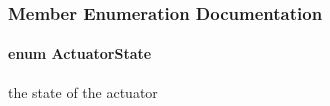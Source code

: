 \subsubsection{Member Enumeration Documentation}
\hypertarget{classOpenRAVE_1_1SensorBase_1_1ActuatorSensorData_aff7db6eb3c126e9c2c2c116ed181fa3c}{
\paragraph[{ActuatorState}]{\setlength{\rightskip}{0pt plus 5cm}enum {\bf ActuatorState}}\hfill}
\label{classOpenRAVE_1_1SensorBase_1_1ActuatorSensorData_aff7db6eb3c126e9c2c2c116ed181fa3c}


the state of the actuator 

